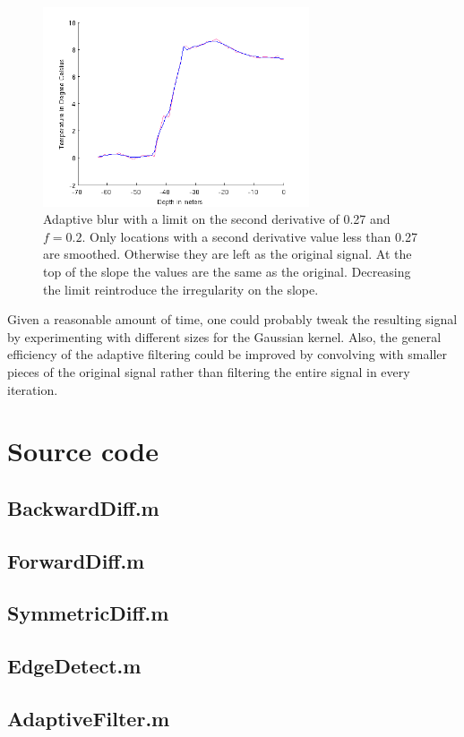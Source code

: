 \documentclass[a4paper, 10pt, final]{article}
\begin{document}
\begin{figure}[!h]
    \centering
    \includegraphics[angle=0,width=0.7\textwidth]{images/adaptive_blur_lim}
    \caption[]{Adaptive blur with a limit on the second derivative of
    0.27 and $f = 0.2$. Only locations with a second derivative value
    less than 0.27 are smoothed. Otherwise they are left as the original
    signal. At the top of the slope the values are the same as the
    original. Decreasing the limit reintroduce the irregularity on the
    slope.}
    \label{adaptive_blur_lim}
\end{figure}

Given a reasonable amount of time, one could probably tweak the
resulting signal by experimenting with different sizes for the Gaussian
kernel. Also, the general efficiency of the adaptive filtering could be
improved by convolving with smaller pieces of the original signal rather
than filtering the entire signal in every iteration.





\appendix
\lstset{language=Matlab, basicstyle=\scriptsize,
    showstringspaces=false, numbers=left, stepnumber=1,
    numberstyle=\tiny, frame=none}
\section{Source code}

\subsection{BackwardDiff.m}


\subsection{ForwardDiff.m}


\subsection{SymmetricDiff.m}


\subsection{EdgeDetect.m}


\subsection{AdaptiveFilter.m}

\end{document}
